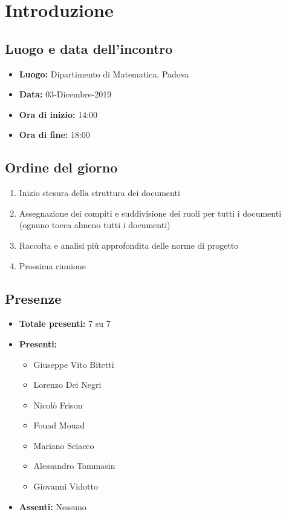 \section*{Introduzione}

\subsection*{Luogo e data dell'incontro}
	\begin{itemize}
		\item \textbf{Luogo:} Dipartimento di Matematica, Padova
		\item \textbf{Data:} 03-Dicembre-2019
		\item \textbf{Ora di inizio:} 14:00
		\item \textbf{Ora di fine:} 18:00
	\end{itemize}

\subsection*{Ordine del giorno}
	\begin{enumerate}
		\item Inizio stesura della struttura dei documenti
		\item Assegnazione dei compiti e suddivisione dei ruoli per tutti i documenti (ognuno tocca almeno tutti i documenti)
		\item Raccolta e analisi più approfondita delle norme di progetto
		\item Prossima riunione
	\end{enumerate}

\subsection*{Presenze}
	\begin{itemize}
		\item \textbf{Totale presenti:} 7 su 7
		\item \textbf{Presenti: }
			\begin{itemize}			
				\item Giuseppe Vito Bitetti
				\item Lorenzo Dei Negri
				\item Nicolò Frison
				\item Fouad Mouad
				\item Mariano Sciacco
				\item Alessandro Tommasin
				\item Giovanni Vidotto
			\end{itemize}
		\item \textbf{Assenti: } 
			Nessuno
	\end{itemize}


